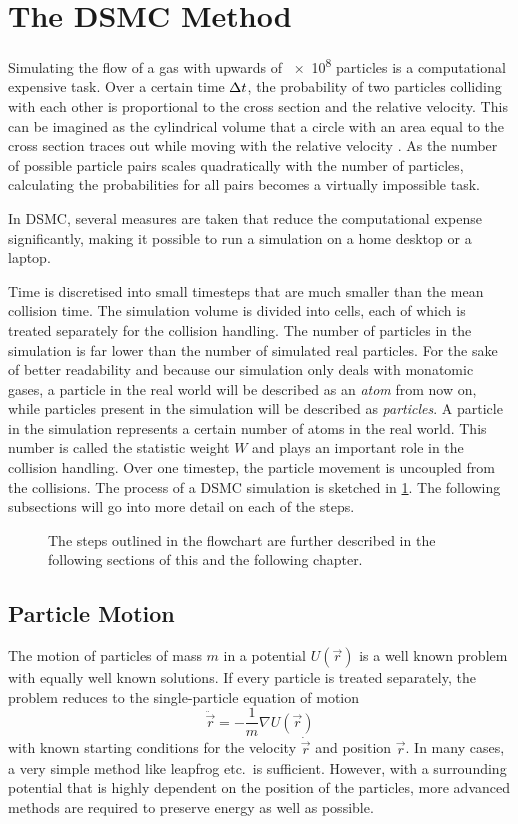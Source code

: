 \section{The DSMC Method}
Simulating the flow of a gas with upwards of \num{e8} particles is a computational expensive task. Over a certain time $\Delta t$, the probability of two particles colliding with each other is proportional to the cross section and the relative velocity. This can be imagined as the cylindrical volume that a circle with an area equal to the cross section traces out while moving with the relative velocity \cite[7]{bird1994}. As the number of possible particle pairs scales quadratically with the number of particles, calculating the probabilities for all pairs becomes a virtually impossible task. 

In DSMC, several measures are taken that reduce the computational expense significantly, making it possible to run a simulation on a home desktop or a laptop.

Time is discretised into small timesteps that are much smaller than the mean collision time. The simulation volume is divided into cells, each of which is treated separately for the collision handling. The number of particles in the simulation is far lower than the number of simulated real particles. For the sake of better readability and because our simulation only deals with monatomic gases, a particle in the real world will be described as an \emph{atom} from now on, while particles present in the simulation will be described as \emph{particles}. A particle in the simulation represents a certain number of atoms in the real world. This number is called the statistic weight $W$ and plays an important role in the collision handling. Over one timestep, the particle movement is uncoupled from the collisions. The process of a DSMC simulation is sketched in \cref{fig:dsmc_flowchart}. The following subsections will go into more detail on each of the steps.
\vfill
\begin{figure}[htbp]
    \centering
    
    \caption[The process of a DSMC simulation]{The steps outlined in the flowchart are further described in the following sections of this and the following chapter.}
    \label{fig:dsmc_flowchart}
\end{figure}
\vfill


\subsection{Particle Motion}
The motion of particles of mass $m$ in a potential $U(\vec{r})$ is a well known problem with equally well known solutions. If every particle is treated separately, the problem reduces to the single-particle equation of motion
\begin{equation*}
    \ddot{\vec{r}} = -\frac{1}{m}\nabla U(\vec{r})
\end{equation*}
with known starting conditions for the velocity $\dot{\vec{r}}$ and position $\vec{r}$. In many cases, a very simple method like leapfrog etc.\ is sufficient. However, with a surrounding potential that is highly dependent on the position of the particles, more advanced methods are required to preserve energy as well as possible.

